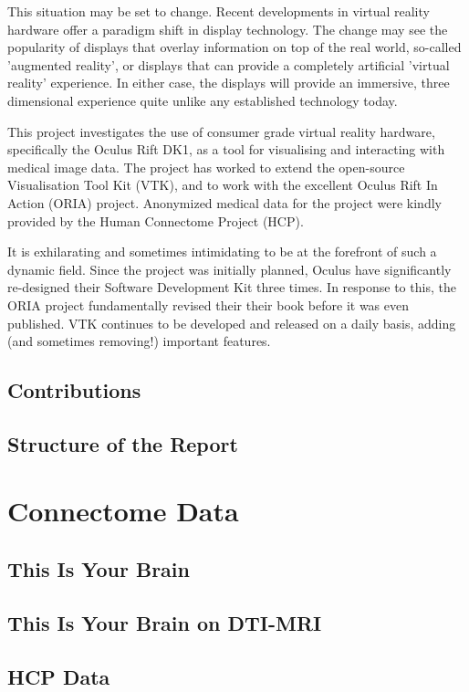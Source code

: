 \documentclass[MSc,paper=a4,pagesize=auto, doublespacing]{icldt}
\begin{document}
This situation may be set to change. Recent developments in virtual reality hardware offer a  paradigm shift in display technology. The change may see the popularity of displays that overlay information on top of the real world, so-called 'augmented reality', or displays that can provide a completely artificial 'virtual reality' experience. In either case, the displays will provide an immersive, three dimensional experience quite unlike any established technology today.

This project investigates the use of consumer grade virtual reality hardware, specifically the Oculus Rift DK1, as a tool for visualising and interacting with medical image data. The project has worked to extend the open-source Visualisation Tool Kit (VTK), and to work with the excellent Oculus Rift In Action (ORIA) project. Anonymized medical data for the project were kindly provided by the Human Connectome Project (HCP).

It is exhilarating and sometimes intimidating to be at the forefront of such a dynamic field. Since the project was initially planned, Oculus have significantly re-designed their Software Development Kit three times. In response to this, the ORIA project fundamentally revised their their book before it was even published. VTK continues to be developed and released on a daily basis, adding (and sometimes removing!) important features.
\section{Contributions}
\section{Structure of the Report}

\chapter{Connectome Data}
\section{This Is Your Brain}
\section{This Is Your Brain on DTI-MRI}
\section{HCP Data}
\end{document}
